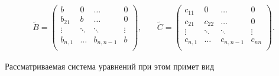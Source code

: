 \begin{equation*}


\begin{array}{cc}

\widetilde{B}=\left(

  \begin{array}{cccc}

    b       & 0       & \ldots       & 0      \\

    b_{21}  & b       & \ldots       & 0      \\

    \vdots  & \ddots  & \ddots       & \vdots \\

    b_{n,1} & \ldots  & b_{n,n-1}    & b    \\

  \end{array}

\right),

\quad &

\widetilde{C}=\left(

    \begin{array}{cccc}

      c_{11}   & 0        & \ldots       & 0      \\

      c_{21}   & c_{22}   & \ldots       & 0      \\

      \vdots   & \ddots   & \ddots       & \vdots \\

      c_{n,1}  & \ldots   & c_{n,n-1}    & c_{nn}    \\

    \end{array}

\right).

\end{array}

\end{equation*}

Рассматриваемая система уравнений при этом примет вид

